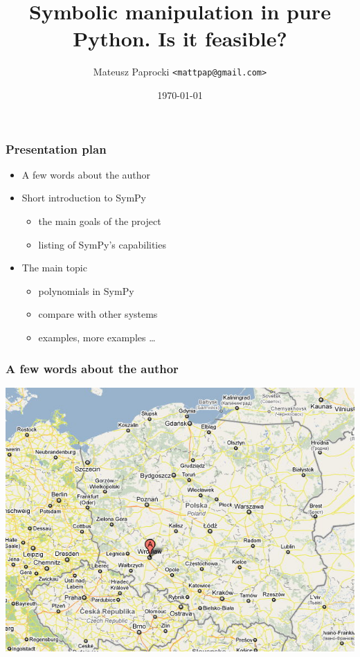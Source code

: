 \documentclass{beamer}
\title{Symbolic manipulation in pure Python. Is it feasible?}
\author{Mateusz Paprocki \texttt{<mattpap@gmail.com>}}
\institute[PWR]{Wrocław University of Technology \linebreak SymPy Development Team}
\date{\today}
\begin{document}

\frame{\titlepage}

\begin{frame}[fragile]
    \frametitle{Presentation plan}

    \begin{itemize}
        \item A few words about the author
        \pause
        \item Short introduction to SymPy
            \begin{itemize}
                \item the main goals of the project
                \item listing of SymPy's capabilities
            \end{itemize}
        \pause
        \item The main topic
            \begin{itemize}
                \item polynomials in SymPy
                \item compare with other systems
                \item examples, more examples \ldots
            \end{itemize}
    \end{itemize}
\end{frame}

\begin{frame}[fragile]
    \frametitle{A few words about the author}

    \begin{center}
        \includegraphics[scale=0.6]{images/wr1.jpg}
    \end{center}
\end{frame}
\end{document}
